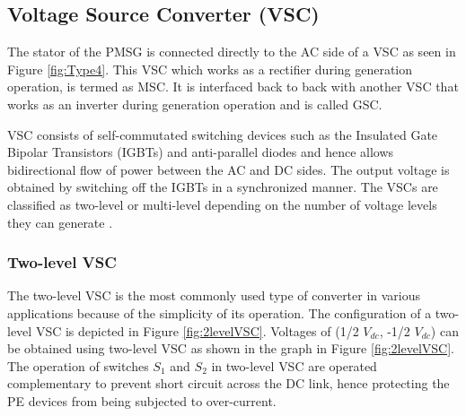 



\subsection{Voltage Source Converter (VSC)}\label{VSC_theory}
The stator of the \gls{PMSG} is connected directly to the \gls{AC} side of a \gls{VSC} as seen in Figure \ref{fig:Type4}. This \gls{VSC} which works as a rectifier during generation operation, is termed as \gls{MSC}. It is interfaced back to back with another \gls{VSC} that works as an inverter during generation operation and is called \gls{GSC}.

\gls{VSC} consists of self-commutated switching devices such as the Insulated Gate Bipolar Transistors (\gls{IGBT}s) and anti-parallel diodes and hence allows bidirectional flow of power between the \gls{AC} and \gls{DC} sides. The output voltage is obtained by switching off the \gls{IGBT}s in a synchronized manner. The \gls{VSC}s are classified as two-level or multi-level depending on the number of voltage levels they can generate \cite{noauthor_appendix_2014}. 

\subsubsection{Two-level VSC}
The two-level \gls{VSC} is the most commonly used type of converter in various applications because of the simplicity of its operation. The configuration of a two-level \gls{VSC} is depicted in Figure \ref{fig:2levelVSC}. Voltages of (1/2 $V_{dc}$, -1/2 $V_{dc}$) can be obtained using two-level \gls{VSC} as shown in the graph in Figure \ref{fig:2levelVSC}. The operation of switches $S_{1}$ and $S_{2}$ in two-level \gls{VSC} are operated complementary to prevent short circuit across the \gls{DC} link, hence protecting the \gls{PE} devices from being subjected to over-current.

